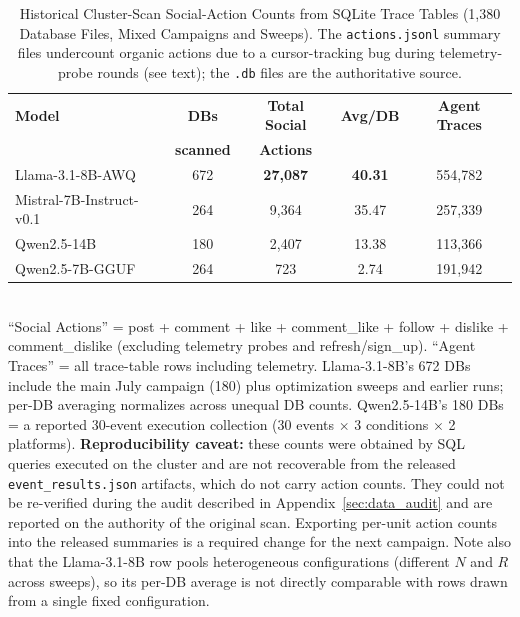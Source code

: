 \begin{table}[!htbp]
\centering
\caption{Historical Cluster-Scan Social-Action Counts from SQLite Trace Tables (1,380 Database Files, Mixed Campaigns and Sweeps). The \texttt{actions.jsonl} summary files undercount organic actions due to a cursor-tracking bug during telemetry-probe rounds (see text); the \texttt{.db} files are the authoritative source.}
\label{tab:action_density_30event}
\small
\begin{tabular}{lcccc}
\toprule
\textbf{Model} & \textbf{DBs} & \textbf{Total Social} & \textbf{Avg/DB} & \textbf{Agent Traces} \\
 & \textbf{scanned} & \textbf{Actions} & & \\
\midrule
Llama-3.1-8B-AWQ  & 672 & \textbf{27,087} & \textbf{40.31} & 554,782 \\
Mistral-7B-Instruct-v0.1    & 264 & 9,364           & 35.47          & 257,339 \\
Qwen2.5-14B   & 180 & 2,407           & 13.38          & 113,366 \\
Qwen2.5-7B-GGUF   & 264 & 723             & 2.74           & 191,942 \\
\bottomrule
\end{tabular}
\smallskip \\
\footnotesize ``Social Actions'' = post + comment + like + comment\_like + follow + dislike + comment\_dislike (excluding telemetry probes and refresh/sign\_up). ``Agent Traces'' = all trace-table rows including telemetry. Llama-3.1-8B's 672 DBs include the main July campaign (180) plus optimization sweeps and earlier runs; per-DB averaging normalizes across unequal DB counts. Qwen2.5-14B's 180 DBs = a reported 30-event execution collection (30 events $\times$ 3 conditions $\times$ 2 platforms). \textbf{Reproducibility caveat:}  these counts were obtained by SQL queries executed on the cluster and are not recoverable from the released \texttt{event\_results.json} artifacts, which do not carry action counts. They could not be re-verified during the audit described in Appendix~\ref{sec:data_audit} and are reported on the authority of the original scan. Exporting per-unit action counts into the released summaries is a required change for the next campaign. Note also that the Llama-3.1-8B row pools heterogeneous configurations (different $N$ and $R$ across sweeps), so its per-DB average is not directly comparable with rows drawn from a single fixed configuration.
\end{table}

